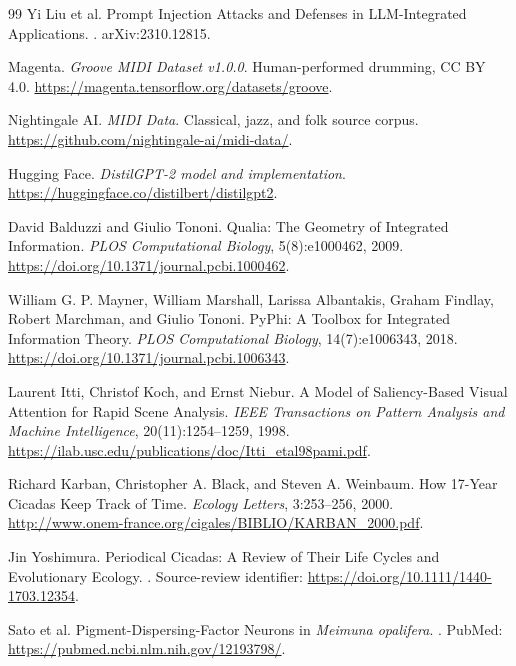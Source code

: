 \begin{thebibliography}{99}
Yi Liu et al.
\newblock Prompt Injection Attacks and Defenses in LLM-Integrated Applications.
. arXiv:2310.12815.

Magenta.
\newblock \emph{Groove MIDI Dataset v1.0.0}.
\newblock Human-performed drumming, CC BY 4.0.
\newblock \url{https://magenta.tensorflow.org/datasets/groove}.

Nightingale AI.
\newblock \emph{MIDI Data}.
\newblock Classical, jazz, and folk source corpus.
\newblock \url{https://github.com/nightingale-ai/midi-data/}.

Hugging Face.
\newblock \emph{DistilGPT-2 model and implementation}.
\newblock \url{https://huggingface.co/distilbert/distilgpt2}.

David Balduzzi and Giulio Tononi.
\newblock Qualia: The Geometry of Integrated Information.
\newblock \emph{PLOS Computational Biology}, 5(8):e1000462, 2009.
\newblock \url{https://doi.org/10.1371/journal.pcbi.1000462}.

William G. P. Mayner, William Marshall, Larissa Albantakis, Graham Findlay, Robert Marchman, and Giulio Tononi.
\newblock PyPhi: A Toolbox for Integrated Information Theory.
\newblock \emph{PLOS Computational Biology}, 14(7):e1006343, 2018.
\newblock \url{https://doi.org/10.1371/journal.pcbi.1006343}.

Laurent Itti, Christof Koch, and Ernst Niebur.
\newblock A Model of Saliency-Based Visual Attention for Rapid Scene Analysis.
\newblock \emph{IEEE Transactions on Pattern Analysis and Machine Intelligence}, 20(11):1254--1259, 1998.
\newblock \url{https://ilab.usc.edu/publications/doc/Itti_etal98pami.pdf}.

Richard Karban, Christopher A. Black, and Steven A. Weinbaum.
\newblock How 17-Year Cicadas Keep Track of Time.
\newblock \emph{Ecology Letters}, 3:253--256, 2000.
\newblock \url{http://www.onem-france.org/cigales/BIBLIO/KARBAN_2000.pdf}.

Jin Yoshimura.
\newblock Periodical Cicadas: A Review of Their Life Cycles and Evolutionary Ecology.
. Source-review identifier: \url{https://doi.org/10.1111/1440-1703.12354}.

Sato et al.
\newblock Pigment-Dispersing-Factor Neurons in \emph{Meimuna opalifera}.
. PubMed: \url{https://pubmed.ncbi.nlm.nih.gov/12193798/}.


\end{thebibliography}
